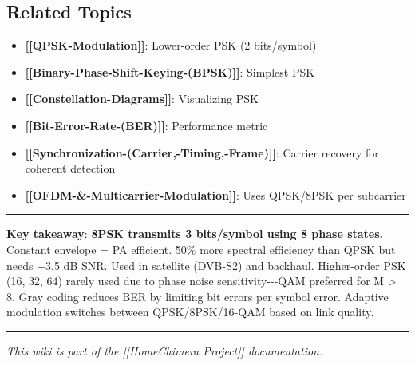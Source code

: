 \subsection{Related Topics}\label{related-topics}

\begin{itemize}
\tightlist
\item
  \textbf{{[}{[}QPSK-Modulation{]}{]}}: Lower-order PSK (2 bits/symbol)
\item
  \textbf{{[}{[}Binary-Phase-Shift-Keying-(BPSK){]}{]}}: Simplest PSK
\item
  \textbf{{[}{[}Constellation-Diagrams{]}{]}}: Visualizing PSK
\item
  \textbf{{[}{[}Bit-Error-Rate-(BER){]}{]}}: Performance metric
\item
  \textbf{{[}{[}Synchronization-(Carrier,-Timing,-Frame){]}{]}}: Carrier
  recovery for coherent detection
\item
  \textbf{{[}{[}OFDM-\&-Multicarrier-Modulation{]}{]}}: Uses QPSK/8PSK
  per subcarrier
\end{itemize}

\begin{center}\rule{0.5\linewidth}{0.5pt}\end{center}

\textbf{Key takeaway}: \textbf{8PSK transmits 3 bits/symbol using 8
phase states.} Constant envelope = PA efficient. 50\% more spectral
efficiency than QPSK but needs +3.5 dB SNR. Used in satellite (DVB-S2)
and backhaul. Higher-order PSK (16, 32, 64) rarely used due to phase
noise sensitivity-\/-\/-QAM preferred for M \textgreater{} 8. Gray
coding reduces BER by limiting bit errors per symbol error. Adaptive
modulation switches between QPSK/8PSK/16-QAM based on link quality.

\begin{center}\rule{0.5\linewidth}{0.5pt}\end{center}

\emph{This wiki is part of the {[}{[}Home\textbar Chimera Project{]}{]}
documentation.}
